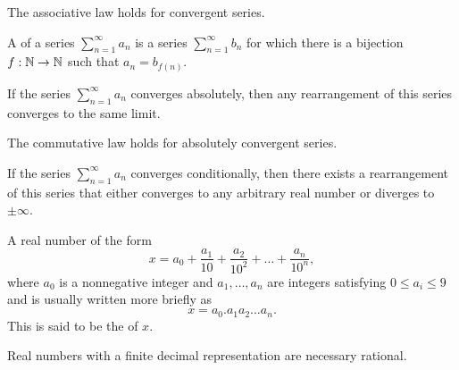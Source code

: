 \begin{theorem}
  The associative law holds for convergent series.
\end{theorem}

\begin{definition}
  A  of a series $\sum_{n = 1}^{\infty} a_n$ is
  a series $\sum_{n = 1}^{\infty} b_n$ for which there is a bijection
  $f : \mathbb N \to \mathbb N$ such that $a_n = b_{f(n)}$.
\end{definition}

\begin{theorem}
  If the series $\sum_{n = 1}^{\infty} a_n$ converges absolutely,
  then any rearrangement of this series converges to the same limit.
\end{theorem}

\begin{corollary}
  The commutative law holds for absolutely convergent series.
\end{corollary}

\begin{theorem}
  If the series $\sum_{n = 1}^{\infty} a_n$ converges conditionally,
  then there exists a rearrangement of this series that either
  converges to any arbitrary real number or diverges to $\pm \infty$.
\end{theorem}

\begin{definition}
  A real number of the form
  \[ x = a_0 + \frac{a_1}{10} + \frac{a_2}{10^2} + \dots + \frac{a_n}{10^n}, \]
  where $a_0$ is a nonnegative integer and $a_1, \dots, a_n$ are
  integers satisfying $0 \leq a_i \leq 9$ and is usually written more briefly as
  \[ x = a_0. a_1 a_2 \ldots a_n. \]
  This is said to be the  of $x$.
\end{definition}

\begin{proposition}
  Real numbers with a finite decimal representation are necessary rational.
\end{proposition}

